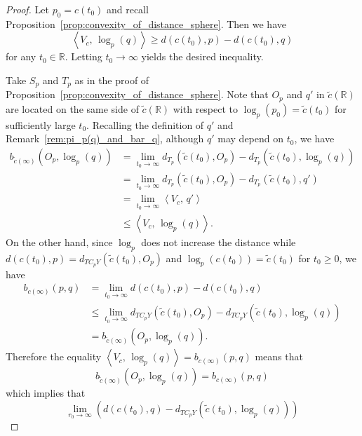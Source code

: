 \documentclass[12pt]{amsart}
\numberwithin{equation}{section}
\theoremstyle{plain}
\theoremstyle{definition}
\theoremstyle{remark}
\newcommand{\R}{{\mathbb R}}
\newcommand{\tcprj}{\log}
\newcommand{\inner}[2]{\left\langle #1,\, #2 \right\rangle}
\begin{document}
\begin{proof}
 Let $p_0 = c(t_0)$ and recall 
 Proposition~\ref{prop:convexity_of_distance_sphere}. Then we have
 \begin{equation*}
  \inner{V_c}{\tcprj_p(q)} \geq d(c(t_0),p)-d(c(t_0),q)
 \end{equation*}
 for any $t_0 \in \R$. Letting $t_0 \to \infty$ yields the desired
 inequality. 

 Take $S_p$ and $T_p$ as in the proof of
 Proposition~\ref{prop:convexity_of_distance_sphere}. 
 Note that 
 $O_p$ and $q'$ in $\tilde c(\R)$ are located on the same side of 
 $\tilde c(\R)$ with respect to $\tcprj_p(p_0) = \tilde c(t_0)$ for
 sufficiently large $t_0$.  Recalling the definition of $q'$ and
 Remark~\ref{rem:pi_p(q)_and_bar_q}, although $q'$ may depend on $t_0$, we have
 \begin{equation*}
  \begin{split}
   b_{\tilde c(\infty)}(O_p,\tcprj_p(q))
   & = \lim_{t_0\to \infty}d_{T_p}(\tilde c(t_0),O_p)
   - d_{T_p}(\tilde c(t_0), \tcprj_p(q)) \\
   & = \lim_{t_0\to \infty}d_{T_p}(\tilde c(t_0),O_p)
   - d_{T_p}(\tilde c(t_0), q') \\
   & = \lim_{t_0\to \infty}\inner{V_c}{q'} \\
   & \leq \inner{V_c}{\tcprj_p(q)}.
  \end{split} 
 \end{equation*}
 On the other hand, since $\tcprj_p$ does not increase the distance while
 $d(c(t_0),p)=d_{TC_pY}(\tilde c(t_0),O_p)$ and 
 $\tcprj_p(c(t_0))=\tilde c(t_0)$ for $t_0 \geq 0$, we have
 \begin{equation*}
\begin{split}
   b_{c(\infty)}(p,q) & = \lim_{t_0 \to \infty}
   d(c(t_0),p) -d(c(t_0),q) \\
   & \leq \lim_{t_0 \to \infty}
    d_{TC_pY}(\tilde c(t_0), O_p) - 
    d_{TC_pY}(\tilde c(t_0), \tcprj_p(q)) \\
   & = b_{\tilde c(\infty)}(O_p, \tcprj_p(q)).
\end{split} 
\end{equation*}
 Therefore the equality 
 $\inner{V_c}{\tcprj_p(q)} =b_{c(\infty)}(p,q)$ means that
 \begin{equation*}
  b_{\tilde c(\infty)}(O_p,\tcprj_p(q))=b_{c(\infty)}(p,q)
 \end{equation*}
 which implies that
 \begin{equation*}
  \lim_{r_0 \to \infty}
   \left(d(c(t_0),q) -d_{TC_pY}(\tilde c(t_0), \tcprj_p(q)) \right)

\end{equation*}
\end{proof}
\end{document}
